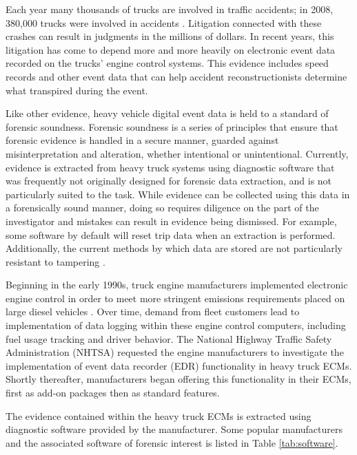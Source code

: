 Each year many thousands of trucks are involved in traffic accidents; in 2008, 380,000 trucks were involved in accidents \cite{NHTSA2008}.
Litigation connected with these crashes can result in judgments in the millions of dollars. In recent years, this litigation has 
come to depend more and more heavily on electronic event data recorded on the trucks' engine control systems. 
This evidence includes speed records and other event data that can help accident reconstructionists 
determine what transpired during the event.

Like other evidence, heavy vehicle digital event data is held to a standard of forensic soundness. Forensic soundness is a series of principles 
that ensure that forensic evidence is handled in a secure manner, guarded against misinterpretation and alteration, whether intentional
or unintentional.
Currently, evidence is extracted from heavy truck systems using diagnostic software that was frequently not originally designed for forensic data extraction, 
and is not particularly suited to the task. While evidence can be collected using this data in a forensically sound 
manner, doing so requires diligence on the part of the investigator and mistakes can result in evidence being dismissed. For example, some software by default will
reset trip data when an extraction is performed.
Additionally, the current methods by which data are stored are not particularly resistant to tampering \cite{Johnson2014}. 


Beginning in the early 1990s, truck engine manufacturers implemented electronic engine control in order to meet more stringent emissions
requirements placed on large diesel vehicles \cite{NHTSA-EDR-2002}. Over time, demand from fleet customers lead to implementation of data logging within these
engine control computers, including fuel usage tracking and driver behavior. The National Highway Traffic Safety Administration (NHTSA) 
requested the engine manufacturers to investigate the implementation
of event data recorder (EDR) functionality in heavy truck ECMs. Shortly thereafter, manufacturers began offering this functionality in their
ECMs, first as add-on packages then as standard features.

The evidence contained within the heavy truck ECMs is extracted using diagnostic software provided by the manufacturer. Some popular
manufacturers and the associated software of forensic interest is listed in Table \ref{tab:software}.

